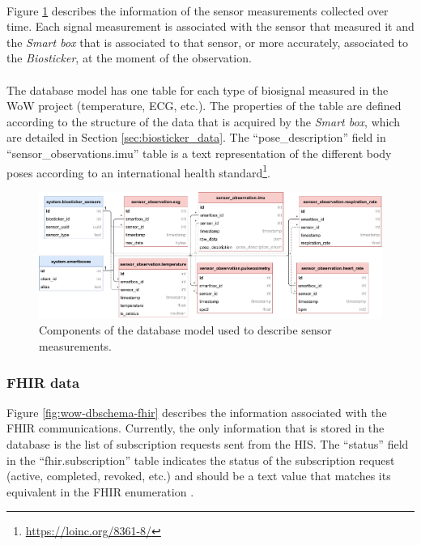 \paragraph{} Figure \ref{fig:wow-dbschema-sensors} describes the information of the sensor measurements collected over time. Each signal measurement is associated with the sensor that measured it and the \textit{Smart box} that is associated to that sensor, or more accurately, associated to the \textit{Biosticker}, at the moment of the observation.

\paragraph{} The database model has one table for each type of biosignal measured in the \acs{WoW} project (temperature, \acs{ECG}, etc.). The properties of the table are defined according to the structure of the data that is acquired by the \textit{Smart box}, which are detailed in Section \ref{sec:biosticker_data}. The ``pose\_description'' field in ``sensor\_observations.imu'' table is a text representation of the different body poses according to an international health standard\footnote{\url{https://loinc.org/8361-8/}}.

\begin{figure}[H]
    \centering
    \includegraphics[width=\linewidth]{images/database-schema-sensordata.pdf}
    \caption{Components of the database model used to describe sensor measurements. }
    \label{fig:wow-dbschema-sensors}
\end{figure}



\subsubsection{\acs{FHIR} data}

Figure \ref{fig:wow-dbschema-fhir} describes the information associated with the \acs{FHIR} communications. Currently, the only information that is stored in the database is the list of subscription requests sent from the \acs{HIS}. The ``status'' field in the ``fhir.subscription'' table indicates the status of the subscription request (active, completed, revoked, etc.) and should be a text value that matches its equivalent in the \acs{FHIR} enumeration \cite{fhir}.

